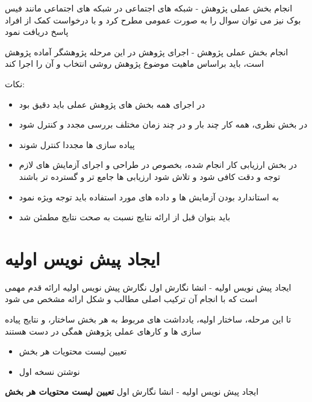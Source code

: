 \documentclass[14pt]{beamer}
\makeatletter
\newcommand{\rtlist}{\raggedleft\rightskip\@totalleftmargin}
\newcommand{\sectionfontsize}{\fontsize{22pt}{0pt}\selectfont}
\newcommand{\framefontsizelarge}{\fontsize{18pt}{0pt}\selectfont}
\newcommand{\frametitlefontsize}{\fontsize{20pt}{0pt}\selectfont}
\makeatother
\begin{document}
\begin{persian}
	\begin{frame}{\frametitlefontsize  انجام بخش عملی پژوهش - شبکه های اجتماعی }
		\framefontsizelarge
		در شبکه های اجتماعی مانند فیس بوک نیز می توان سوال را به صورت عمومی مطرح کرد و با درخواست کمک از افراد پاسخ دریافت نمود
	\end{frame}

	\begin{frame}{\frametitlefontsize  انجام بخش عملی پژوهش - اجرای پژوهش }
		\framefontsizelarge
		در این مرحله پژوهشگر آماده پژوهش است، باید براساس ماهیت موضوع پژوهش روشی انتخاب و آن را اجرا کند
		
		نکات: 
		\begin{itemize}\rtlist
			\item در اجرای همه بخش های پژوهش عملی باید دقیق بود
			\item در بخش نظری، همه کار چند بار و در چند زمان مختلف بررسی مجدد و کنترل شود
			\item پیاده سازی ها مجددا کنترل شوند
			\item در بخش ارزیابی کار انجام شده، بخصوص در طراحی و اجرای آزمایش های لازم توجه و دقت کافی شود و تلاش شود ارزیابی ها جامع تر و گسترده تر باشند
			\item به استاندارد بودن آزمایش ها و داده های مورد استفاده باید توجه ویژه نمود
			\item باید بتوان قبل از ارائه نتایج نسبت به صحت نتایج مطمئن شد
		\end{itemize}
	\end{frame}
	
	\section{\sectionfontsize ایجاد پیش نویس اولیه}	
	
	\begin{frame}{\frametitlefontsize  ایجاد پیش نویس اولیه - انشا نگارش اول }
		\framefontsizelarge
		نگارش پیش نویس اولیه ارائه قدم مهمی است که با انجام آن ترکیب اصلی مطالب و شکل ارائه مشخص می شود
		
		تا این مرحله، ساختار اولیه، یادداشت های مربوط به هر بخش ساختار، و نتایج پیاده سازی ها و کارهای عملی پژوهش همگی در دست هستند
		\begin{itemize}\rtlist
			\item تعیین لیست محتویات هر بخش
			\item نوشتن نسخه اول
		\end{itemize}
	\end{frame}
	
	\begin{frame}{\frametitlefontsize  ایجاد پیش نویس اولیه - انشا نگارش اول }
		\framefontsizelarge
		\textbf{تعیین لیست محتویات هر بخش}
		

\end{frame}
\end{persian}
\end{document}
